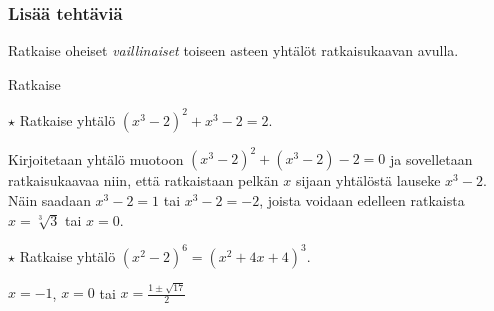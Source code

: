 \begin{tehtavasivu}
\subsubsection*{Lisää tehtäviä}

\begin{tehtava}
    Ratkaise oheiset \textit{vaillinaiset} toiseen asteen yhtälöt ratkaisukaavan avulla.
    \begin{vastaus}
    \end{vastaus}
\end{tehtava}

\begin{tehtava}
    Ratkaise
    \begin{vastaus}
    \end{vastaus}
\end{tehtava}

\begin{tehtava} %
	$\star$ Ratkaise yhtälö $(x^3-2)^2+x^3-2=2$.
	\begin{vastaus}
		Kirjoitetaan yhtälö muotoon $(x^3-2)^2+(x^3-2)-2=0$ ja sovelletaan ratkaisukaavaa niin, että ratkaistaan pelkän $x$ sijaan yhtälöstä lauseke $x^3-2$. Näin saadaan $x^3-2=1$ tai $x^3-2=-2$, joista voidaan edelleen ratkaista $x=\sqrt[3]{3}$ tai $x=0$.
	\end{vastaus}
\end{tehtava}

\begin{tehtava}
	$\star$ Ratkaise yhtälö $(x^2-2)^6=(x^2+4x+4)^3$.
	\begin{vastaus}
		$x=-1$, $x=0$ tai $x=\frac{1 \pm \sqrt{17}}{2}$
	\end{vastaus}
\end{tehtava}

\end{tehtavasivu}